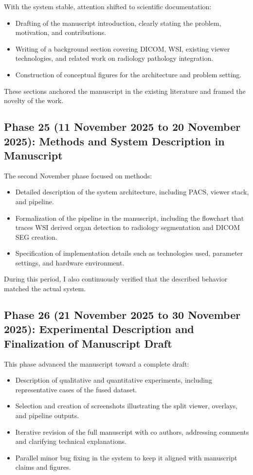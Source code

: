 \documentclass[11pt,a4paper]{article}
\begin{document}
With the system stable, attention shifted to scientific documentation:

\begin{itemize}
    \item Drafting of the manuscript introduction, clearly stating the problem, motivation, and contributions.
    \item Writing of a background section covering DICOM, WSI, existing viewer technologies, and related work on radiology pathology integration.
    \item Construction of conceptual figures for the architecture and problem setting.
\end{itemize}

These sections anchored the manuscript in the existing literature and framed the novelty of the work.

\subsection*{Phase 25 (11 November 2025 to 20 November 2025): Methods and System Description in Manuscript}

The second November phase focused on methods:

\begin{itemize}
    \item Detailed description of the system architecture, including PACS, viewer stack, and pipeline.
    \item Formalization of the pipeline in the manuscript, including the flowchart that traces WSI derived organ detection to radiology segmentation and DICOM SEG creation.
    \item Specification of implementation details such as technologies used, parameter settings, and hardware environment.
\end{itemize}

During this period, I also continuously verified that the described behavior matched the actual system.

\subsection*{Phase 26 (21 November 2025 to 30 November 2025): Experimental Description and Finalization of Manuscript Draft}

This phase advanced the manuscript toward a complete draft:

\begin{itemize}
    \item Description of qualitative and quantitative experiments, including representative cases of the fused dataset.
    \item Selection and creation of screenshots illustrating the split viewer, overlays, and pipeline outputs.
    \item Iterative revision of the full manuscript with co authors, addressing comments and clarifying technical explanations.
    \item Parallel minor bug fixing in the system to keep it aligned with manuscript claims and figures.
\end{itemize}
\end{document}
